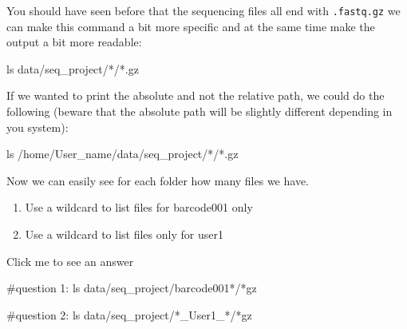 \documentclass[
  letterpaper,
  DIV=11,
  numbers=noendperiod]{scrreprt}
\newenvironment{Shaded}{}{}
\newcommand{\CommentTok}[1]{\textcolor[rgb]{0.42,0.45,0.49}{#1}}
\newcommand{\FunctionTok}[1]{\textcolor[rgb]{0.44,0.26,0.76}{#1}}
\newcommand{\NormalTok}[1]{\textcolor[rgb]{0.14,0.16,0.18}{#1}}
\newcommand{\PreprocessorTok}[1]{\textcolor[rgb]{0.84,0.23,0.29}{#1}}
\providecommand{\tightlist}{%
  \setlength{\itemsep}{0pt}\setlength{\parskip}{0pt}}\usepackage{longtable,booktabs,array}
\begin{document}
You should have seen before that the sequencing files all end with
\texttt{.fastq.gz} we can make this command a bit more specific and at
the same time make the output a bit more readable:

\begin{Shaded}
\begin{Highlighting}[]
\FunctionTok{ls}\NormalTok{ data/seq\_project/}\PreprocessorTok{*}\NormalTok{/}\PreprocessorTok{*}\NormalTok{.gz}
\end{Highlighting}
\end{Shaded}

If we wanted to print the absolute and not the relative path, we could
do the following (beware that the absolute path will be slightly
different depending in you system):

\begin{Shaded}
\begin{Highlighting}[]
\FunctionTok{ls}\NormalTok{ /home/User\_name/data/seq\_project/}\PreprocessorTok{*}\NormalTok{/}\PreprocessorTok{*}\NormalTok{.gz}
\end{Highlighting}
\end{Shaded}

Now we can easily see for each folder how many files we have.

\begin{tcolorbox}[enhanced jigsaw, bottomtitle=1mm, colframe=quarto-callout-caution-color-frame, left=2mm, leftrule=.75mm, coltitle=black, colbacktitle=quarto-callout-caution-color!10!white, toprule=.15mm, rightrule=.15mm, opacityback=0, titlerule=0mm, colback=white, breakable, bottomrule=.15mm, title=\textcolor{quarto-callout-caution-color}{\faFire}\hspace{0.5em}{Exercise}, arc=.35mm, toptitle=1mm, opacitybacktitle=0.6]

\begin{enumerate}
\def\labelenumi{\arabic{enumi}.}
\tightlist
\item
  Use a wildcard to list files for barcode001 only
\item
  Use a wildcard to list files only for user1
\end{enumerate}

Click me to see an answer

\begin{Shaded}
\begin{Highlighting}[]
\CommentTok{\#question 1:}
\FunctionTok{ls}\NormalTok{ data/seq\_project/barcode001}\PreprocessorTok{*}\NormalTok{/}\PreprocessorTok{*}\NormalTok{gz}

\CommentTok{\#question 2:}
\FunctionTok{ls}\NormalTok{ data/seq\_project/}\PreprocessorTok{*}\NormalTok{\_User1\_}\PreprocessorTok{*}\NormalTok{/}\PreprocessorTok{*}\NormalTok{gz}
\end{Highlighting}
\end{Shaded}

\end{tcolorbox}
\end{document}
